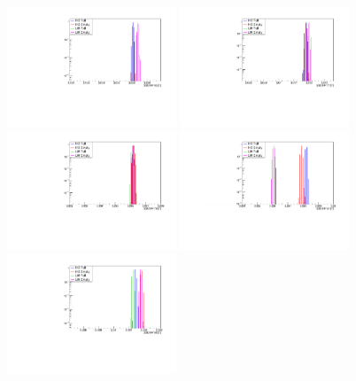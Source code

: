 \begin{figure}[!tbh]
    \centering
    \includegraphics*[width=0.45\textwidth]{03-Detectors/Figures/hall-probes_2017-02-7/hp_65.pdf}
    \includegraphics*[width=0.45\textwidth]{03-Detectors/Figures/hall-probes_2017-02-7/hp_77.pdf}
    \includegraphics*[width=0.45\textwidth]{03-Detectors/Figures/hall-probes_2017-02-7/hp_79.pdf}
    \includegraphics*[width=0.45\textwidth]{03-Detectors/Figures/hall-probes_2017-02-7/hp_67.pdf}
    \includegraphics*[width=0.45\textwidth]{03-Detectors/Figures/hall-probes_2017-02-7/hp_66.pdf}

\end{figure}
